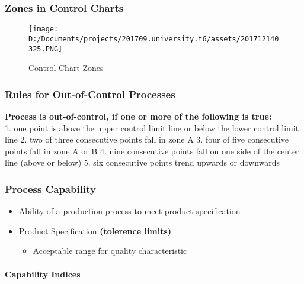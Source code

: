 \documentclass[11pt]{article}
\makeatletter
\def\maxwidth{\ifdim\Gin@nat@width>\linewidth\linewidth
    \else\Gin@nat@width\fi}
\let\Oldincludegraphics\includegraphics
\renewcommand{\includegraphics}[1]{\Oldincludegraphics[width=.8\maxwidth]{#1}}
\providecommand{\tightlist}{%
      \setlength{\itemsep}{0pt}\setlength{\parskip}{0pt}}
\makeatother
\begin{document}
\hypertarget{zones-in-control-charts}{%
\subsubsection{Zones in Control Charts}\label{zones-in-control-charts}}

\begin{figure}
\centering
\texttt{[image: D:/Documents/projects/201709.university.t6/assets/201712140325.PNG]}
\caption{Control Chart Zones}
\end{figure}

\hypertarget{rules-for-out-of-control-processes}{%
\subsubsection{Rules for Out-of-Control
Processes}\label{rules-for-out-of-control-processes}}

\textbf{Process is out-of-control, if one or more of the following is
true:}\\
1. one point is above the upper control limit line or below the lower
control limit line 2. two of three consecutive points fall in zone A 3.
four of five consecutive points fall in zone A or B 4. nine consecutive
points fall on one side of the center line (above or below) 5. six
consecutive points trend upwards or downwards

\hypertarget{process-capability}{%
\subsubsection{Process Capability}\label{process-capability}}

\begin{itemize}
\tightlist
\item
  Ability of a production process to meet product specification
\item
  Product Specification \textbf{(tolerence limits)}

  \begin{itemize}
  \tightlist
  \item
    Acceptable range for quality characteristic
  \end{itemize}
\end{itemize}

\hypertarget{capability-indices}{%
\paragraph{Capability Indices}\label{capability-indices}}
\end{document}
